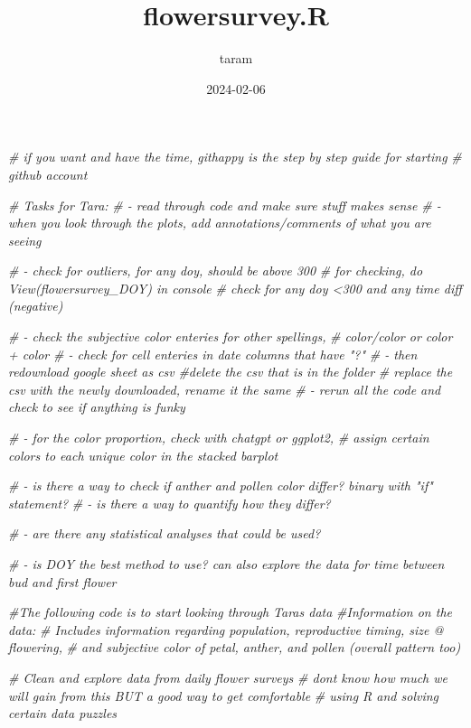 \documentclass[
]{article}
\title{flowersurvey.R}
\author{taram}
\date{2024-02-06}
\newenvironment{Shaded}{\begin{snugshade}}{\end{snugshade}}
\newcommand{\CommentTok}[1]{\textcolor[rgb]{0.56,0.35,0.01}{\textit{#1}}}
\begin{document}
\maketitle

\begin{Shaded}
\begin{Highlighting}[]
\CommentTok{\# if you want and have the time, githappy is the step by step guide for starting}
\CommentTok{\# github account}


\CommentTok{\# Tasks for Tara:}
\CommentTok{\# {-} read through code and make sure stuff makes sense}
\CommentTok{\#  {-} when you look through the plots, add annotations/comments of what you are seeing}

\CommentTok{\# {-} check for outliers, for any doy, should be above 300}
    \CommentTok{\# for checking, do View(flowersurvey\_DOY) in console}
    \CommentTok{\# check for any doy \textless{}300 and any time diff (negative)}


\CommentTok{\# {-} check the subjective color enteries for other spellings,}
\CommentTok{\#       color/color or color + color}
\CommentTok{\# {-} check for cell enteries in date columns that have "?"}
\CommentTok{\# {-} then redownload google sheet as csv}
    \CommentTok{\#delete the csv that is in the folder}
    \CommentTok{\# replace the csv with the newly downloaded, rename it the same}
\CommentTok{\# {-} rerun all the code and check to see if anything is funky}


\CommentTok{\# {-} for the color proportion, check with chatgpt or ggplot2,}
\CommentTok{\#     assign certain colors to each unique color in the stacked barplot}

\CommentTok{\# {-} is there a way to check if anther and pollen color differ? binary with "if" statement?}
\CommentTok{\#     {-} is there a way to quantify how they differ?}

\CommentTok{\# {-} are there any statistical analyses that could be used?}

\CommentTok{\# {-} is DOY the best method to use? can also explore the data for time between bud and first flower}


\CommentTok{\#The following code is to start looking through Tara\textquotesingle{}s data}
\CommentTok{\#Information on the data:}
\CommentTok{\# Includes information regarding population, reproductive timing, size @ flowering,}
\CommentTok{\#   and subjective color of petal, anther, and pollen (overall pattern too)}


\CommentTok{\# Clean and explore data from daily flower surveys}
\CommentTok{\# don\textquotesingle{}t know how much we will gain from this BUT a good way to get comfortable}
\CommentTok{\# using R and solving certain data puzzles}


\end{Highlighting}
\end{Shaded}
\end{document}
